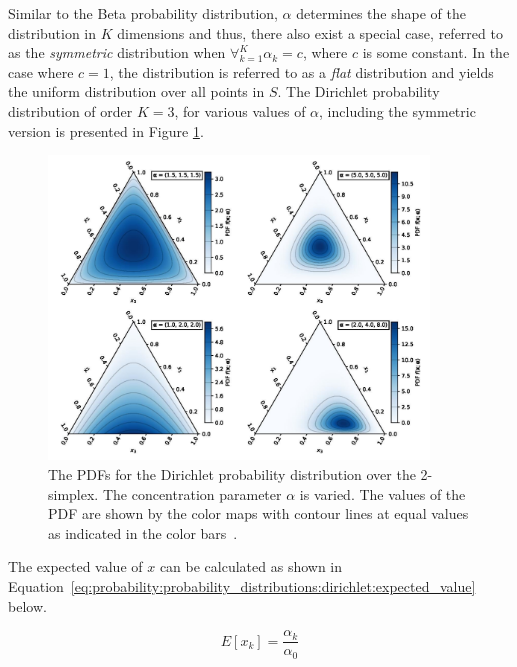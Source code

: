 Similar to the Beta probability distribution, $\alpha$ determines the shape of the distribution in $K$ dimensions and thus, there also exist a special case, referred to as the \textit{symmetric} distribution when $\forall_{k=1}^{K} \alpha_{k} = c$, where $c$ is some constant. In the case where $c = 1$, the distribution is referred to as a \textit{flat} distribution and yields the uniform distribution over all points in $S$. The Dirichlet probability distribution of order $K = 3$, for various values of $\alpha$, including the symmetric version is presented in Figure \ref{fig:probability:probability_distributions:dirichlet}.

\begin{figure}[htb]
      \centering
      \includegraphics[width=0.9\textwidth]{images/dirichlet.pdf}
      \caption{The \acfp{PDF} for the Dirichlet probability distribution over the 2-simplex. The concentration parameter $\alpha$ is varied. The values of the \acs{PDF} are shown by the color maps with contour lines at equal values as indicated in the color bars~\cite{ref:dirichlet:2020}.}
      \label{fig:probability:probability_distributions:dirichlet}
\end{figure}

The expected value of $x$ can be calculated as shown in Equation~\eqref{eq:probability:probability_distributions:dirichlet:expected_value} below.

\begin{equation}
      \label{eq:probability:probability_distributions:dirichlet:expected_value}
      E[x_{k}] = \frac{\alpha_{k}}{\alpha_{0}}
\end{equation}

